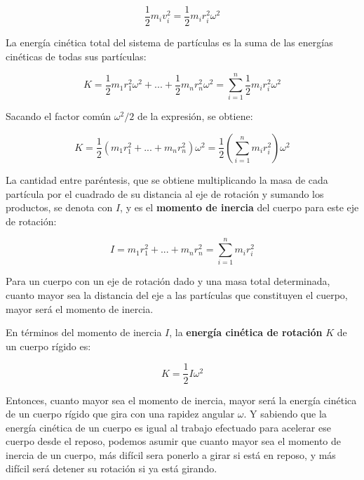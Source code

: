 \documentclass[letter,twoside,11pt]{article}
\begin{document}
\begin{equation*}
    \frac{1}{2} m_i v^2_i = \frac{1}{2} m_i r^2_i \omega^2
\label{cinetica}
\end{equation*}

La energía cinética total del sistema de partículas es la suma de las energías
cinéticas de todas sus partículas:

\begin{equation*}
    K = \frac{1}{2} m_1 r^2_1 \omega^2 + ... + \frac{1}{2} m_n r^2_n \omega^2 = \sum_{i=1}^{n} \frac{1}{2} m_i r^2_i \omega^2
\label{cineticatotal1}
\end{equation*}

Sacando el factor común $\omega^2/2$ de la expresión, se obtiene:

\begin{equation*}
    K = \frac{1}{2} (m_1 r^2_1 + ... + m_n r^2_n ) \omega^2 = \frac{1}{2} \left( \sum_{i=1}^{n} m_i r^2_i \right) \omega^2
\label{cineticatotal2}
\end{equation*}

La cantidad entre paréntesis, que se obtiene multiplicando la masa de cada
partícula por el cuadrado de su distancia al eje de rotación y sumando los
productos, se denota con $I$, y es el \textbf{momento de inercia} del cuerpo
para este eje de rotación:

\begin{equation}
    I = m_1 r^2_1 + ... + m_n r^2_n = \sum_{i=1}^{n} m_i r^2_i
\label{momentodeinercia}
\end{equation}

Para un cuerpo con un eje de rotación dado y una masa total determinada, cuanto
mayor sea la distancia del eje a las partículas que constituyen el cuerpo, mayor
será el momento de inercia.

En términos del momento de inercia $I$, la \textbf{energía cinética de rotación}
$K$ de un cuerpo rígido es:

\begin{equation}
    K = \frac{1}{2} I \omega^2
\label{cineticarotacional}
\end{equation}

Entonces, cuanto mayor sea el momento de inercia, mayor será la energía cinética
de un cuerpo rígido que gira con una rapidez angular $\omega$. Y sabiendo que la
energía cinética de un cuerpo es igual al trabajo efectuado para acelerar ese
cuerpo desde el reposo, podemos asumir que cuanto mayor sea el momento de
inercia de un cuerpo, más difícil sera ponerlo a girar si está en reposo, y más
difícil será detener su rotación si ya está girando.
\end{document}
